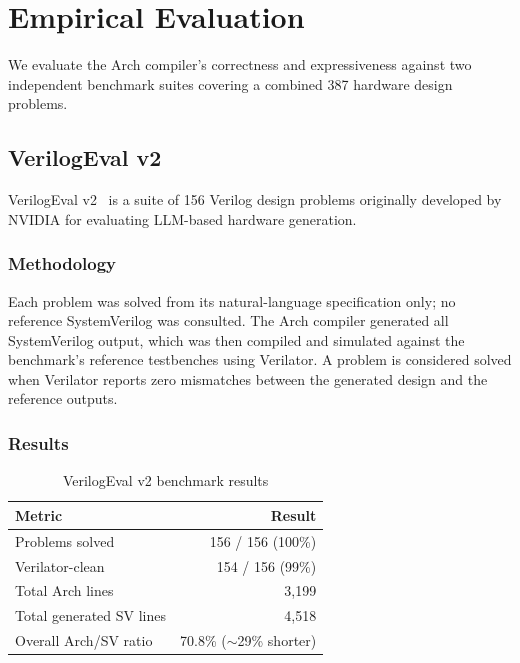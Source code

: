 \documentclass[11pt,twocolumn]{article}
\begin{document}
\section{Empirical Evaluation}\label{sec:benchmark}

We evaluate the Arch compiler's correctness and expressiveness against two independent benchmark suites covering a combined 387 hardware design problems.

\subsection{VerilogEval v2}\label{sec:verilogeval}

VerilogEval v2~\cite{verilogeval} is a suite of 156 Verilog design problems originally developed by NVIDIA for evaluating LLM-based hardware generation.

\subsubsection{Methodology}

Each problem was solved from its natural-language specification only; no reference SystemVerilog was consulted. The Arch compiler generated all SystemVerilog output, which was then compiled and simulated against the benchmark's reference testbenches using Verilator. A problem is considered solved when Verilator reports zero mismatches between the generated design and the reference outputs.

\subsubsection{Results}

\begin{table}[t]
\centering
\caption{VerilogEval v2 benchmark results}
\label{tab:benchmark}
\small
\begin{tabular}{@{}lr@{}}
\toprule
\textbf{Metric} & \textbf{Result} \\
\midrule
Problems solved & 156 / 156 (100\%) \\
Verilator-clean & 154 / 156 (99\%) \\
Total Arch lines & 3,199 \\
Total generated SV lines & 4,518 \\
Overall Arch/SV ratio & 70.8\% (${\sim}$29\% shorter) \\
\bottomrule
\end{tabular}
\end{table}
\end{document}
